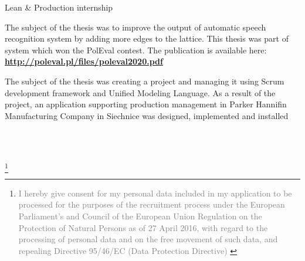 \documentclass[10pt,a4paper,ragged2e,withhyper, normalphoto]{altacv}
\newcommand\blfootnote[1]{%
  \begingroup
  \renewcommand\thefootnote{}\footnote{#1}%
  \addtocounter{footnote}{-1}%
  \endgroup
}
\begin{document}
\begin{paracol}{2}
    \divider
    
    Lean \& Production internship 
    
    \divider



The subject of the thesis was to improve the output of automatic speech recognition system by adding more edges to the lattice. This thesis was part of system which won the PolEval contest. The publication is available here:
\\ \textcolor{PastelRed}{\textbf{\url{http://poleval.pl/files/poleval2020.pdf}}}

\medskip

The subject of the thesis was creating a project and managing it using Scrum development framework and Unified Modeling Language.
As a result of the project, an application supporting production management in Parker Hannifin Manufacturing Company in Siechnice was designed, implemented and installed
\medskip


\\
 \\


\blfootnote{\textcolor{gray}{
I hereby give consent for my personal data included in my application to be processed for the purposes of the recruitment process under the European Parliament's and Council of the European Union Regulation on the Protection of Natural Persons as of 27 April 2016, with regard to the processing of personal data and on the free movement of such data, and repealing Directive 95/46/EC (Data Protection Directive)
}}


\switchcolumn



\end{paracol}
\end{document}

